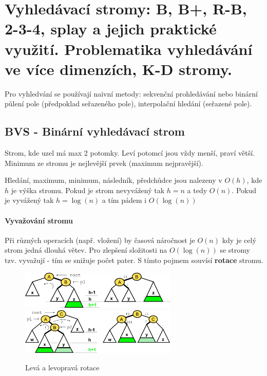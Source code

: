 \section[PAL - Stromy]{Vyhledávací stromy: B, B+, R-B, 2-3-4, splay a jejich praktické využití. Problematika vyhledávání ve více dimenzích, K-D stromy.}

Pro vyhledvání se používají naivní metody: sekvenční prohledávání nebo binární půlení pole (předpoklad seřazeného pole), interpolační hledání (seřazené pole).

\subsection{BVS - Binární vyhledávací strom}
Strom, kde uzel má max 2 potomky. Leví potomcí jsou vždy menší, praví větší. Minimum ze stromu je nejlevější prvek (maximum nejpravější).

Hledání, maximum, minimum, následník, předchůdce jsou nalezeny v $O(h)$, kde $h$ je výška stromu. Pokud je strom nevyvážený tak $h=n$ a tedy $O(n)$. Pokud je vyvážený tak $h = \log(n)$ a tím pádem i $O(\log(n))$

\paragraph{Vyvažování stromu} Při různých operacích (např. vložení) by časová náročnost je $O(n)$ kdy je celý strom jedná dlouhá větev. Pro zlepšení složitosti na $O(\log(n))$ se stromy tzv. vyvažují - tím se snižuje počet pater. S tímto pojmem souvísí \textbf{rotace} stromu.

\begin{figure}[h]
    \begin{center}
        \includegraphics[width=75mm]{spolecne/03/images/rotace-L}
        \includegraphics[width=75mm]{spolecne/03/images/rotace-LR}
    \end{center}
    \caption{Levá a levopravá rotace}
\end{figure}

